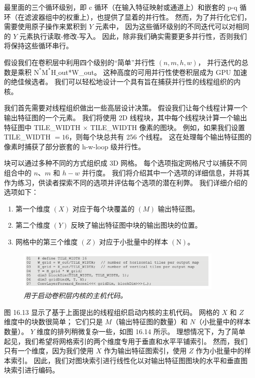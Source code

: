 最里面的三个循环级别，即 c 循环（在输入特征映射或通道上）和嵌套的 p-q 循环（在滤波器组中的权重上），也提供了显着的并行性。 
然而，为了并行化它们，需要使用原子操作来累积到 $Y$ 元素中，
因为这些循环级别的不同迭代可以对相同的 $Y$ 元素执行读取-修改-写入。 
因此，除非我们确实需要更多并行性，否则我们将保持这些循环串行。

假设我们在卷积层中利用四个级别的“简单”并行性 $(n, m, h, w)$，
并行迭代的总数是乘积 $\mathrm{N}^{*} \mathrm{ M}^{*} \mathrm{H} \_$out*W\_out。 
这种高度的可用并行性使卷积层成为 GPU 加速的绝佳候选者。 我们可以轻松地设计一个具有旨在捕获并行性的线程组织的内核。

我们首先需要对线程组织做出一些高层设计决策。 假设我们让每个线程计算一个输出特征图的一个元素。 
我们将使用 2D 线程块，其中每个线程块计算一个输出特征图中 TILE\_WIDTH $\times$ TILE\_WIDTH 像素的图块。 
例如，如果我们设置 TILE\_WIDTH $=16$，则每个块总共有 256 个线程。 
这在处理每个输出特征图的像素时捕获了部分嵌套的 h-w-loop 级并行性。

块可以通过多种不同的方式组织成 3D 网格。 每个选项指定网格尺寸以捕获不同组合中的 $n、m$ 和 $h-w$ 并行度。 
我们将介绍其中一个选项的详细信息，并将其作为练习，供读者探索不同的选项并评估每个选项的潜在利弊。 我们详细介绍的选项如下：
\begin{enumerate}
   \item 第一个维度 $(X)$ 对应于每个块覆盖的 $(M)$ 输出特征图。

   \item 第二个维度 $(Y)$ 反映了输出特征图中块的输出图块的位置。

   \item 网格中的第三个维度 $(Z)$ 对应于小批量中的样本 $(\mathrm{N})$。
\end{enumerate}

\begin{figure}[H]
	\centering
	\includegraphics[width=0.9\textwidth]{figs/F16.13.png}
	\caption{\textit{用于启动卷积层内核的主机代码。}}
\end{figure}

图 16.13 显示了基于上面提出的线程组织启动内核的主机代码。 网格的 $X$ 和 $Z$ 维度中的块数很简单； 
它们只是 $M$（输出特征图的数量）和 $N$（小批量中的样本数量）。 $Y$ 维度的排列稍微复杂一些，如图 16.14 所示。 
理想情况下，为了简单起见，我们希望将网格索引的两个维度专用于垂直和水平平铺索引。 
然而，我们只有一个维度，因为我们使用 $X$ 作为输出特征图索引，使用 $Z$ 作为小批量中的样本索引。 
因此，我们对图块索引进行线性化以对输出特征图图块的水平和垂直图块索引进行编码。

